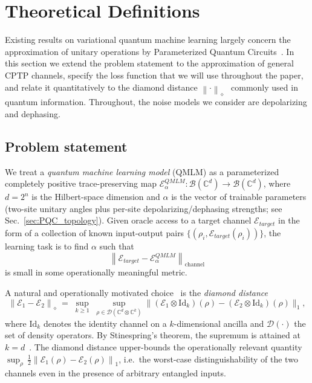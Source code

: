 \documentclass[%
 reprint,
superscriptaddress,
 amsmath,amssymb,
 aps,
]{revtex4-2}
\newcommand{\E}{\mathcal{E}}
\newcommand{\norm}[1]{\left\lVert#1\right\rVert}
\begin{document}
\section{Theoretical Definitions}
\label{sec:theoretical_definition}
Existing results on variational quantum machine learning largely concern the approximation of unitary operations by Parameterized Quantum Circuits~\cite{khatri2019qaqc,caro2022generalization,sharma2020noiseresilience}. In this section we extend the problem statement to the approximation of general CPTP channels, specify the loss function that we will use throughout the paper, and relate it quantitatively to the diamond distance $\norm{\cdot}_\diamond$~\cite{kitaev1997quantum,watrous2018theory} commonly used in quantum information. Throughout, the noise models we consider are depolarizing and dephasing.

\subsection{Problem statement}

We treat a \emph{quantum machine learning model} (QMLM) as a parameterized completely positive trace-preserving map $\E^{QMLM}_{\alpha}:\mathcal{B}(\mathbb{C}^d)\to\mathcal{B}(\mathbb{C}^d)$, where $d=2^n$ is the Hilbert-space dimension and $\alpha$ is the vector of trainable parameters (two-site unitary angles plus per-site depolarizing/dephasing strengths; see Sec.~\ref{sec:PQC_topology}). Given oracle access to a target channel $\E_{target}$ in the form of a collection of known input-output pairs $\{(\rho_i,\E_{target}(\rho_i))\}$, the learning task is to find $\alpha$ such that
\begin{equation}
    \norm{\E_{target}-\E^{QMLM}_{\alpha}}_{\mathrm{channel}}
\end{equation}
is small in some operationally meaningful metric.

A natural and operationally motivated choice~\cite{kitaev1997quantum,watrous2018theory} is the \emph{diamond distance}
\begin{equation}
    \norm{\E_1 - \E_2}_{\diamond} \;=\; \sup_{k\ge 1}\;\sup_{\rho\in\mathcal{D}(\mathbb{C}^{d}\otimes \mathbb{C}^k)} \bigl\| (\E_1 \otimes \mathrm{Id}_k)(\rho) - (\E_2 \otimes \mathrm{Id}_k)(\rho) \bigr\|_1,
    \label{eq:diamond}
\end{equation}
where $\mathrm{Id}_k$ denotes the identity channel on a $k$-dimensional ancilla and $\mathcal{D}(\cdot)$ the set of density operators. By Stinespring's theorem, the supremum is attained at $k=d$~\cite{watrous2018theory}. The diamond distance upper-bounds the operationally relevant quantity $\sup_\rho\,\tfrac{1}{2}\norm{\E_1(\rho)-\E_2(\rho)}_1$, i.e.\ the worst-case distinguishability of the two channels even in the presence of arbitrary entangled inputs.
\end{document}
